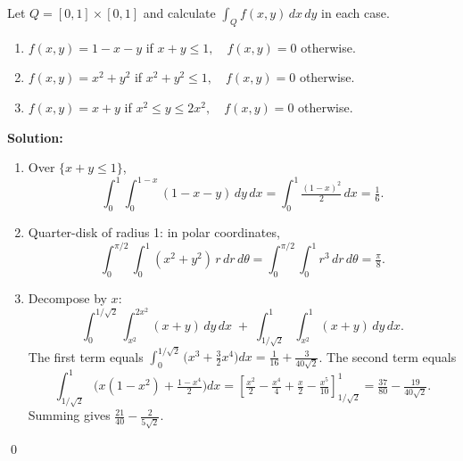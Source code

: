\begin{problembox}
Let \( Q = [0, 1] \times [0, 1] \) and calculate \( \int_{Q} f(x, y) \, dx \, dy \) in each case.
\begin{enumerate}[label=(\alph*)]
    \item \( f(x, y) = 1 - x - y \) if \( x + y \leq 1, \quad f(x, y) = 0 \) otherwise.
    \item \( f(x, y) = x^2 + y^2 \) if \( x^2 + y^2 \leq 1, \quad f(x, y) = 0 \) otherwise.
    \item \( f(x, y) = x + y \) if \( x^2 \leq y \leq 2x^2, \quad f(x, y) = 0 \) otherwise.
\end{enumerate}
\end{problembox}

\bigskip\noindent\textbf{Solution:}
\begin{enumerate}[label=(\alph*)]
    \item Over $\{x+y\le 1\}$,
    \[ \int_0^1 \!\int_0^{1-x} (1-x-y)\,dy\,dx = \int_0^1 \tfrac{(1-x)^2}{2}\,dx = \tfrac{1}{6}. \]
    \item Quarter-disk of radius 1: in polar coordinates,
    \[ \int_0^{\pi/2}\!\int_0^1 (x^2+y^2)\,r\,dr\,d\theta = \int_0^{\pi/2}\!\int_0^1 r^3\,dr\,d\theta = \tfrac{\pi}{8}. \]
    \item Decompose by $x$:
    \[ \int_0^{1/\sqrt{2}} \!\int_{x^2}^{2x^2} (x+y)\,dy\,dx\; +\; \int_{1/\sqrt{2}}^{1} \!\int_{x^2}^{1} (x+y)\,dy\,dx. \]
    The first term equals $\int_0^{1/\sqrt{2}} \big(x^3+\tfrac{3}{2}x^4\big)dx= \tfrac{1}{16}+\tfrac{3}{40\sqrt{2}}$. The second term equals
    \[ \int_{1/\sqrt{2}}^{1} \Big(x(1-x^2)+\tfrac{1-x^4}{2}\Big)dx = \left[\tfrac{x^2}{2}-\tfrac{x^4}{4}+\tfrac{x}{2}-\tfrac{x^5}{10}\right]_{1/\sqrt{2}}^{1} = \tfrac{37}{80}-\tfrac{19}{40\sqrt{2}}. \]
    Summing gives $\tfrac{21}{40}-\tfrac{2}{5\sqrt{2}}$.
\end{enumerate}\qed


